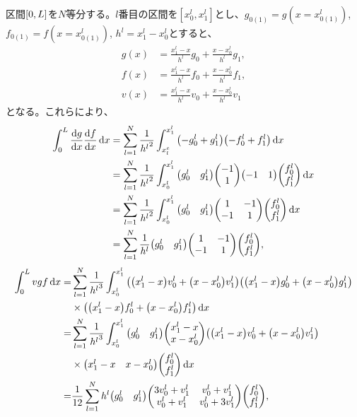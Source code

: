 \documentclass[xelatex,ja=standard]{bxjsarticle}
\begin{document}
区間$\qty[0,L]$を$N$等分する。$l$番目の区間を$[x^l_0,x^l_1]$とし、$g_{0(1)} = g(x=x^l_{0(1)})$, $f_{0(1)} = f(x=x^l_{0(1)})$, $h^l = x^l_1 - x^l_0$とすると、
\begin{align}
    g(x) &= \frac{x^l_1 - x}{h^l}g_0 + \frac{x-x^l_0}{h^l}g_1,\\
    f(x) &= \frac{x^l_1 - x}{h^l}f_0 + \frac{x-x^l_0}{h^l}f_1,\\
    v(x) &= \frac{x^l_1 - x}{h^l}v_0 + \frac{x-x^l_0}{h^l}v_1
\end{align}
となる。これらにより、
\begin{align}
    \int_0^L \dv{g}{x}\dv{f}{x}\dd{x} 
    &= \sum_{l=1}^N \frac{1}{{h^l}^2}\int_{x_l^e}^{x^l_1}\qty(-g^l_0 + g^l_1)\qty(-f^l_0 + f^l_1)\dd{x}\notag\\
    &= \sum_{l=1}^N \frac{1}{{h^l}^2}\int_{x^l_0}^{x^l_1}\mqty(g^l_0 & g^l_1)\mqty(-1\\1)\mqty(-1 & 1)\mqty(f^l_0 \\ f^l_1)\dd{x}\notag\\
    &= \sum_{l=1}^N \frac{1}{{h^l}^2}\int_{x^l_0}^{x^l_1}\mqty(g^l_0 & g^l_1)\mqty(1 & -1 \\ -1 & 1)\mqty(f^l_0 \\ f^l_1)\dd{x}\notag\\
    &= \sum_{l=1}^N \frac{1}{h^l}\mqty(g^l_0 & g^l_1)\mqty(1 & -1 \\ -1 & 1)\mqty(f^l_0 \\ f^l_1),
\end{align}
\begin{align}
    \int_0^L vgf\dd{x}
    =& \sum_{l=1}^N \frac{1}{{h^l}^3}\int_{x^l_0}^{x^l_1}
    \qty(\qty(x^l_1 - x)v^l_0 + \qty(x-x^l_0)v^l_1)
    \qty(\qty(x^l_1 - x)g^l_0 + \qty(x-x^l_0)g^l_1)\notag\\
    &\times\qty(\qty(x^l_1 - x)f^l_0 + \qty(x-x^l_0)f^l_1)
    \dd{x}\notag\\
    =& \sum_{l=1}^N \frac{1}{{h^l}^3}\int_{x^l_0}^{x^l_1}
    \mqty(g^l_0 & g^l_1) \mqty(x^l_1 - x \\ x-x^l_0)
    \qty(\qty(x^l_1 - x)v^l_0 + \qty(x-x^l_0)v^l_1)\notag\\
    &\times\mqty(x^l_1 - x & x-x^l_0)\mqty(f^l_0 \\ f^l_1)
    \dd{x}\notag\\
    =& \frac{1}{12}\sum_{l=1}^N h^l
    \mqty(g^l_0 & g^l_1) \mqty(3v_0^l +v_1^l & v_0^l +v_1^l\\ v_0^l +v_1^l&v_0^l +3v_1^l)\mqty(f^l_0 \\ f^l_1),
\end{align}
\end{document}
